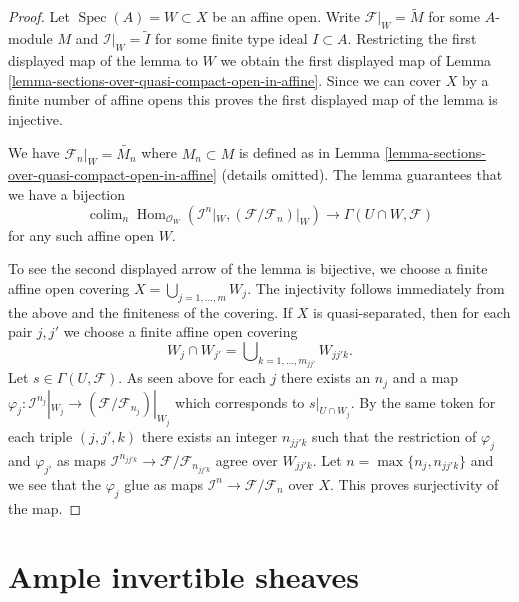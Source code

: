 \documentclass{stacks-project}
\theoremstyle{plain}
\theoremstyle{definition}
\theoremstyle{remark}
\numberwithin{equation}{subsection}
\def\colim{\mathop{\mathrm{colim}}\nolimits}
\def\Spec{\mathop{\mathrm{Spec}}}
\def\Hom{\mathop{\mathrm{Hom}}\nolimits}
\begin{document}
\begin{proof}
Let $\Spec(A) = W \subset X$ be an affine open. Write
$\mathcal{F}|_W = \widetilde{M}$ for some $A$-module $M$
and $\mathcal{I}|_W = \widetilde{I}$ for some finite type
ideal $I \subset A$. Restricting the first displayed map
of the lemma to $W$ we obtain the first displayed map of
Lemma \ref{lemma-sections-over-quasi-compact-open-in-affine}.
Since we can cover $X$ by a finite number of affine opens this
proves the first displayed map of the lemma is injective.

\medskip\noindent
We have $\mathcal{F}_n|_W = \widetilde{M_n}$ where
$M_n \subset M$ is defined as in
Lemma \ref{lemma-sections-over-quasi-compact-open-in-affine}
(details omitted). The lemma guarantees that we have a bijection
$$
\colim_n  \Hom_{\mathcal{O}_W}(
\mathcal{I}^n|_W, (\mathcal{F}/\mathcal{F}_n)|_W)
\longrightarrow
\Gamma(U \cap W, \mathcal{F})
$$
for any such affine open $W$.

\medskip\noindent
To see the second displayed arrow of the lemma is bijective,
we choose a finite affine open covering $X = \bigcup_{j = 1, \ldots, m} W_j$.
The injectivity follows immediately from the above and the finiteness of
the covering. If $X$ is quasi-separated, then for each pair
$j, j'$ we choose a finite affine open covering
$$
W_j \cap W_{j'} = \bigcup\nolimits_{k = 1, \ldots, m_{jj'}} W_{jj'k}.
$$
Let $s \in \Gamma(U, \mathcal{F})$. As seen above for each $j$ there exists
an $n_j$ and a map
$\varphi_j : \mathcal{I}^{n_j}|_{W_j} \to
(\mathcal{F}/\mathcal{F}_{n_j})|_{W_j}$
which corresponds to $s|_{U \cap W_j}$.
By the same token for each triple $(j, j', k)$ there exists an integer
$n_{jj'k}$ such that the restriction of $\varphi_j$ and $\varphi_{j'}$
as maps $\mathcal{I}^{n_{jj'k}} \to \mathcal{F}/\mathcal{F}_{n_{jj'k}}$
agree over $W_{jj'k}$. Let $n = \max\{n_j, n_{jj'k}\}$ and we see that
the $\varphi_j$ glue as maps
$\mathcal{I}^n \to \mathcal{F}/\mathcal{F}_n$ over $X$.
This proves surjectivity of the map.
\end{proof}













\section{Ample invertible sheaves}
\label{section-ample}
\end{document}
